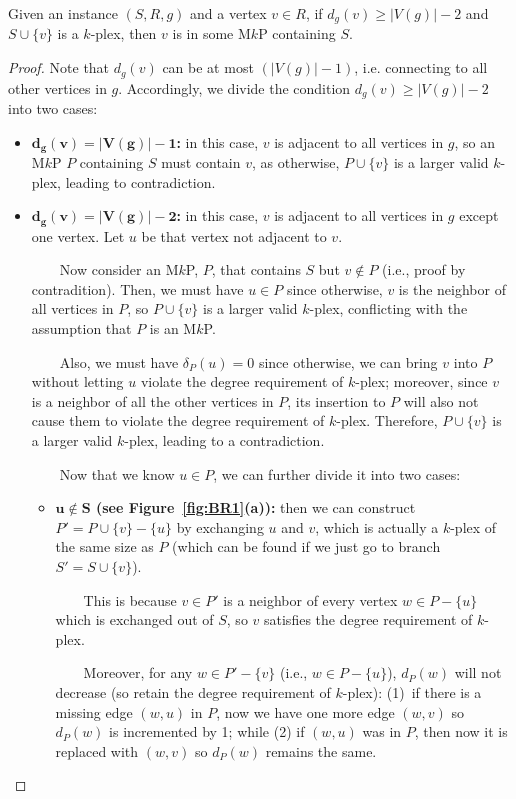\documentclass[sigconf, nonacm]{acmart}
\begin{document}
\vspace{1mm}
 Given an instance $(S, R, g)$ and a vertex $v\in R$, if $d_g(v)\ge |V(g)|-2$ and $S\cup \{v\}$ is a $k$-plex, then $v$ is in some M$k$P containing $S$.

\begin{proof}
Note that $d_g(v)$ can be at most $(|V(g)|-1)$, i.e. connecting to all other vertices in $g$. Accordingly, we divide the condition $d_g(v)\ge |V(g)|-2$ into two cases:
\begin{itemize}
\item {\bf $\mathbf{d_g(v)=|V(g)|-1}$:} in this case, $v$ is adjacent to all vertices in $g$, so an M$k$P $P$ containing $S$ must contain $v$, as otherwise, $P\cup \{v\}$ is a larger valid $k$-plex, leading to contradiction. 

\item {\bf $\mathbf{d_g(v)=|V(g)|-2}$:} in this case, $v$ is adjacent to all vertices in $g$ except one vertex. Let $u$ be that vertex not adjacent to $v$.

\ \ \ \ Now consider an M$k$P, $P$, that contains $S$ but $v\notin P$ (i.e., proof by contradition). Then, we must have $u\in P$ since otherwise, $v$ is the neighbor of all vertices in $P$, so $P\cup \{v\}$ is a larger valid $k$-plex, conflicting with the assumption that $P$ is an M$k$P. 

\ \ \ \ Also, we must have $\delta_P(u)=0$ since otherwise, we can bring $v$ into $P$ without letting $u$ violate the degree requirement of $k$-plex; moreover, since $v$ is a neighbor of all the other vertices in $P$, its insertion to $P$ will also not cause them to violate the degree requirement of $k$-plex. Therefore, $P\cup \{v\}$ is a larger valid $k$-plex, leading to a contradiction.

\ \ \ \ Now that we know $u\in P$, we can further divide it into two cases:
\begin{itemize}
\item {\bf $\mathbf{u\notin S}$ (see Figure~\ref{fig:BR1}(a)):} then we can construct $P'=P\cup \{v\}-\{u\}$ by exchanging $u$ and $v$, which is actually a $k$-plex of the same size as $P$ (which can be found if we just go to branch $S'=S\cup\{v\}$).

\ \ \ \ This is because $v\in P'$ is a neighbor of every vertex $w\in P-\{u\}$ which is exchanged out of $S$, so $v$ satisfies the degree requirement of $k$-plex.

\ \ \ \ Moreover, for any $w\in P'-\{v\}$ (i.e., $w\in P-\{u\}$), $d_P(w)$ will not decrease (so retain the degree requirement of $k$-plex): (1)~if there is a missing edge $(w, u)$ in $P$, now we have one more edge $(w, v)$ so $d_P(w)$ is incremented by 1; while (2) if $(w, u)$ was in $P$, then now it is replaced with $(w, v)$ so $d_P(w)$ remains the same.


\end{itemize}
\end{itemize}
\end{proof}
\end{document}

